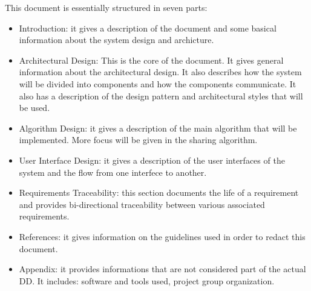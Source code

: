 This document is essentially structured in seven parts:
\begin{itemize}
	\item Introduction: it gives a description of the  document and some basical information about the system design and archicture. 
	
	\item Architectural Design: This is the core of the document.
	 It gives general information about the architectural design. It also describes how the system will be divided into components and how the components communicate. It also has a description of the design pattern and architectural styles that will be used.
	
	\item Algorithm Design: it gives a description of the main algorithm that will be implemented. More focus will be given in the sharing algorithm.
	
	\item User Interface Design: it gives a description of the user interfaces of the system and the flow from one interfece to another.
	
	\item Requirements Traceability: this section documents the life of a requirement and provides bi-directional traceability between various associated requirements. 
	
	\item References: it gives information on the guidelines used in order to redact this document.
	
	\item Appendix: it provides informations that are not considered part of the actual DD. It includes: software and tools used, project group organization.
	
\end{itemize}